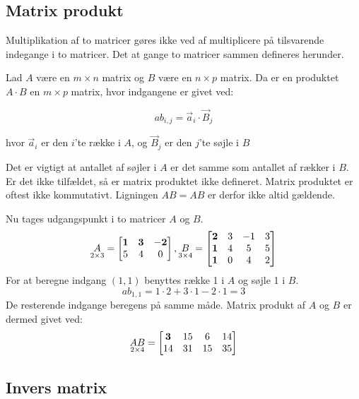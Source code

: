 \subsection{Matrix produkt}
Multiplikation af to matricer gøres ikke ved af multiplicere på tilsvarende indegange i to matricer. Det at gange to matricer sammen defineres herunder. 
\begin{defn} 
Lad $A$ være en $m \times n$ matrix og $B$ være en $n \times p$ matrix. Da er en produktet $A \cdot B$ en $m \times p$ matrix, hvor indgangene er givet ved: 

$$ab_{i,j} = \vec{a}_i \cdot \vec{B}_j$$

hvor $\vec{a}_i$ er den $i$'te række i $A$, og $\vec{B}_j$ er den $j$'te søjle i $B$
\label{def:(matrixprodukt)}
\end{defn}
Det er vigtigt at antallet af søjler i $A$ er det samme som antallet af rækker i $B$. Er det ikke tilfældet, så er matrix produktet ikke defineret. Matrix produktet er oftest ikke kommutativt. Ligningen $AB=AB$ er derfor ikke altid gældende. 
\begin{eks}
Nu tages udgangspunkt i to matricer $A$ og $B$. 
\begin{align*}
\underset{2 \times 3}{A}= \begin{bmatrix}
	\bf{1} & \bf{3} & \bf{-2} \\
	5 & 4 & 0 	
\end{bmatrix},
\underset{3 \times 4}{B}= \begin{bmatrix}
	\bf{2} & 3 & -1 & 3 \\
	\bf{1} & 4 & 5 & 5\\
	\bf{1} & 0 & 4 & 2
\end{bmatrix}  
\end{align*}
For at beregne indgang $(1,1)$ benyttes række 1 i $A$ og søjle 1 i $B$. 
$$ab_{1,1}=1\cdot 2+3\cdot 1-2 \cdot 1 = 3$$ 
De resterende indgange beregens på samme måde. 
Matrix produkt af $A$ og $B$ er dermed givet ved:
\begin{align*}
\underset{2 \times 4}{AB}= \begin{bmatrix}
	\bf{3} & 15 & 6 & 14 \\
	14 & 31 & 15 & 35
\end{bmatrix}  
\end{align*}
\end{eks}



\subsection{Invers matrix}

